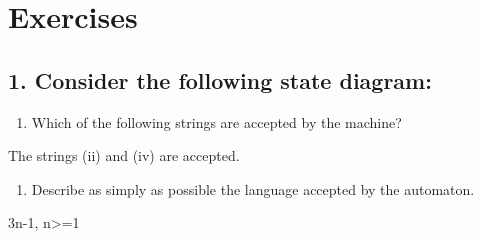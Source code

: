 \section{Exercises}\label{exercises}

\subsection{1. Consider the following state
diagram:}\label{consider-the-following-state-diagram}

\begin{enumerate}
\def\labelenumi{(\alph{enumi})}

\item
  Which of the following strings are accepted by the machine?
\end{enumerate}

The strings (ii) and (iv) are accepted.

\begin{enumerate}
\def\labelenumi{(\alph{enumi})}
\setcounter{enumi}{1}

\item
  Describe as simply as possible the language accepted by the automaton.
\end{enumerate}

3n-1, n\textgreater{}=1

